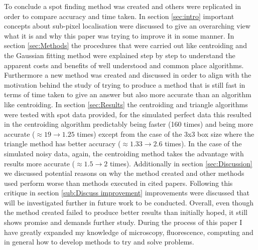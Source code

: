 \documentclass[aps,pra,a4paper,nofootinbib,onecolumn,tightenlines,longbibliography,12pt,amsfonts,amssymb,amsmath,floatfix]{revtex4-2} %
\begin{document}
  To conclude a spot finding method was created and others were replicated in order to compare 
  accuracy and time taken. In section \ref{sec:intro} important concepts about sub-pixel localisation 
  were discussed to give an overarching view what it is and why this paper was trying to improve it 
  in some manner. In section \ref{sec:Methods} the procedures that were carried out like centroiding 
  and the Gaussian fitting method were explained step by step to understand the apparent costs and benefits 
  of well understood and common place algorithms. Furthermore a new method was created and discussed in order 
  to align with the motivation behind the study of trying to produce a method that is still fast in terms 
  of time taken to give an answer but also more accurate than an algorithm like centroiding. In section \ref{sec:Results}
  the centroiding and triangle algorithms were tested with spot data provided, for the simulated perfect data this resulted 
  in the centroiding algorithm predictably being faster (160 times) and being more accurate ($\approx 19\rightarrow 1.25$ times) 
  except from the case of the 3x3 box size where the triangle method has better accuracy ($\approx 1.33\rightarrow 2.6$ times).
  In the case of the simulated noisy data, again, the centroiding method takes the advantage with results more 
  accurate ($\approx 1.5\rightarrow 2$ times). Additionally in section \ref{sec:Discussion} we discussed potential 
  reasons on why the method created and other methods used perform worse than methods executed in cited papers. 
  Following this critique in section \ref{sub:Discuss improvement} improvements were discussed that will be investigated 
  further in future work to be conducted. Overall, even though the method created failed to produce better results 
  than initially hoped, it still shows promise and demands further study. During the process of this paper I have 
  greatly expanded my knowledge of microscopy, fluorescence, computing and in general how to develop methods to 
  try and solve problems. 




\newpage

\end{document}

